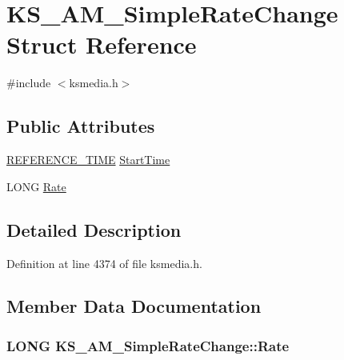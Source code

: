\hypertarget{struct_k_s___a_m___simple_rate_change}{}\section{K\+S\+\_\+\+A\+M\+\_\+\+Simple\+Rate\+Change Struct Reference}
\label{struct_k_s___a_m___simple_rate_change}


{\ttfamily \#include $<$ksmedia.\+h$>$}

\subsection*{Public Attributes}
\begin{DoxyCompactItemize}
\item 
\hyperlink{ksmedia_8h_a83927f70641d4e9a344563bd9ddb15ae}{R\+E\+F\+E\+R\+E\+N\+C\+E\+\_\+\+T\+I\+ME} \hyperlink{struct_k_s___a_m___simple_rate_change_aebe6a3cab584b867b69f0830fccd4604}{Start\+Time}
\item 
L\+O\+NG \hyperlink{struct_k_s___a_m___simple_rate_change_aa8a7489a5b9a32da505b7274bfeb062e}{Rate}
\end{DoxyCompactItemize}


\subsection{Detailed Description}


Definition at line 4374 of file ksmedia.\+h.



\subsection{Member Data Documentation}
\subsubsection[{\texorpdfstring{Rate}{Rate}}]{\setlength{\rightskip}{0pt plus 5cm}L\+O\+NG K\+S\+\_\+\+A\+M\+\_\+\+Simple\+Rate\+Change\+::\+Rate}\hypertarget{struct_k_s___a_m___simple_rate_change_aa8a7489a5b9a32da505b7274bfeb062e}{}\label{struct_k_s___a_m___simple_rate_change_aa8a7489a5b9a32da505b7274bfeb062e}


